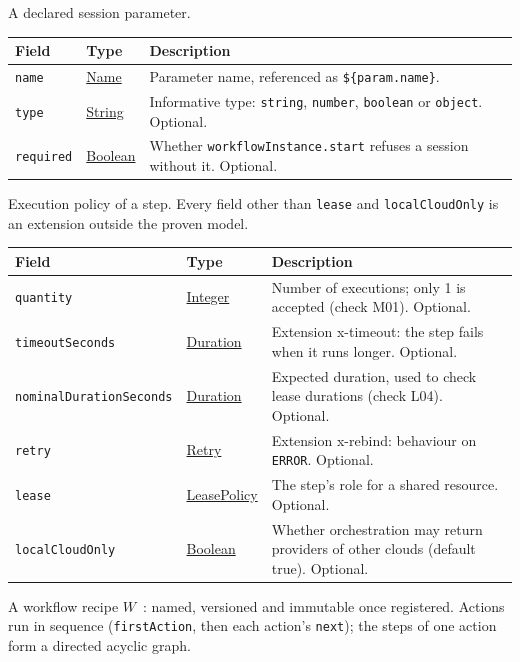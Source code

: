\documentclass[a4paper]{arrowhead}
\newcommand{\mref}[1]{{\textcolor{ArrowheadPurple}{\hyperref[sec:model:#1]{#1}}}}
\newcommand{\pref}[1]{{\textcolor{ArrowheadGrey}{\hyperref[sec:model:primitives:#1]{#1}}}}
\begin{document}
A declared session parameter.

{\small
\begin{longtable}{|p{3.9cm}|p{4.4cm}|p{7.5cm}|}

\hline
\rowcolor{gray!33} Field & Type & Description \\ \hline
\endhead
\texttt{name} & \pref{Name} & Parameter name, referenced as \texttt{\$\{param.name\}}. \\ \hline
\texttt{type} & \pref{String} & Informative type: \texttt{string}, \texttt{number}, \texttt{boolean} or \texttt{object}. Optional. \\ \hline
\texttt{required} & \pref{Boolean} & Whether \texttt{workflowInstance.start} refuses a session without it. Optional. \\ \hline
\end{longtable}
}

Execution policy of a step. Every field other than \texttt{lease} and \texttt{localCloudOnly} is an extension outside the proven model.

{\small
\begin{longtable}{|p{3.9cm}|p{4.4cm}|p{7.5cm}|}

\hline
\rowcolor{gray!33} Field & Type & Description \\ \hline
\endhead
\texttt{quantity} & \pref{Integer} & Number of executions; only 1 is accepted (check M01). Optional. \\ \hline
\texttt{timeoutSeconds} & \pref{Duration} & Extension x-timeout: the step fails when it runs longer. Optional. \\ \hline
\texttt{nominalDurationSeconds} & \pref{Duration} & Expected duration, used to check lease durations (check L04). Optional. \\ \hline
\texttt{retry} & \mref{Retry} & Extension x-rebind: behaviour on \texttt{ERROR}. Optional. \\ \hline
\texttt{lease} & \mref{LeasePolicy} & The step's role for a shared resource. Optional. \\ \hline
\texttt{localCloudOnly} & \pref{Boolean} & Whether orchestration may return providers of other clouds (default true). Optional. \\ \hline
\end{longtable}
}

A workflow recipe $W$~\cite{varga2026}: named, versioned and immutable once registered. Actions run in sequence (\texttt{firstAction}, then each action's \texttt{next}); the steps of one action form a directed acyclic graph.
\end{document}
